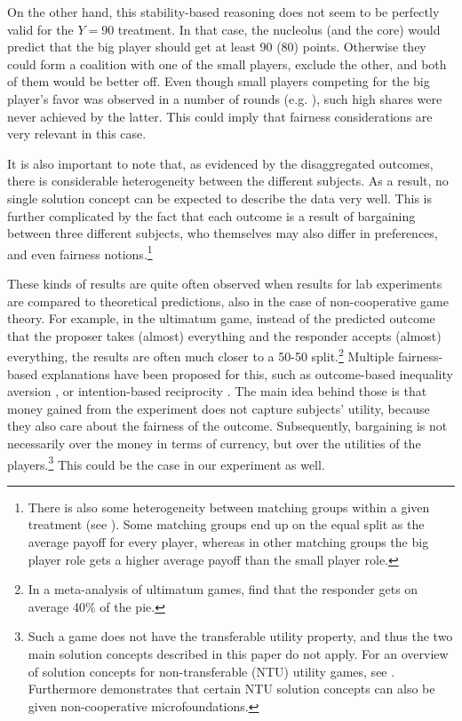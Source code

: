 \documentclass[12pt]{article}
\begin{document}
On the other hand, this stability-based reasoning does not seem to be perfectly valid for the $Y=90$ treatment. In that case, the nucleolus (and the core) would predict that the big player should get at least 90 (80) points. Otherwise they could form a coalition with one of the small players, exclude the other, and both of them would be better off. Even though small players competing for the big player's favor was observed in a number of rounds (e.g. ), such high shares were never achieved by the latter. This could imply that fairness considerations are very relevant in this case.

It is also important to note that, as evidenced by the disaggregated outcomes, there is considerable heterogeneity between the different subjects. As a result, no single solution concept can be expected to describe the data very well. This is further complicated by the fact that each  outcome is a result of bargaining between three different subjects, who themselves may also differ in preferences, and even fairness notions.\footnote{There is also some heterogeneity between matching groups within a given treatment (see ). Some matching groups end up on the equal split as the average payoff for every player, whereas in other matching groups the big player role gets a higher average payoff than the small player role.}

These kinds of results are quite often observed when results for lab experiments are compared to theoretical predictions, also in the case of non-cooperative game theory. For example, in the ultimatum game, instead of the predicted outcome that the proposer takes (almost) everything and the responder accepts (almost) everything, the results are often much closer to a 50-50 split.\footnote{In a meta-analysis of ultimatum games, \textcite{oosterbeek2004cultural} find that the responder gets on average 40\% of the pie.} Multiple fairness-based explanations have been proposed for this, such as outcome-based inequality aversion \parencite[e.g.][]{fehr1999theory,bolton2000erc}, or intention-based reciprocity \parencite[e.g.][]{rabin1993incorporating}. The main idea behind those is that money gained from the experiment does not capture subjects' utility, because they also care about the fairness of the outcome. Subsequently, bargaining is not necessarily over the money in terms of currency, but over the utilities of the players.\footnote{Such a game does not have the transferable utility property, and thus the two main solution concepts described in this paper do not apply. For an overview of solution concepts for non-transferable (NTU) utility games, see \textcite{mclean2002values}. Furthermore \textcite{hart1996bargaining} demonstrates that certain NTU solution concepts can also be given non-cooperative microfoundations.} This could be the case in our experiment as well.
\end{document}
